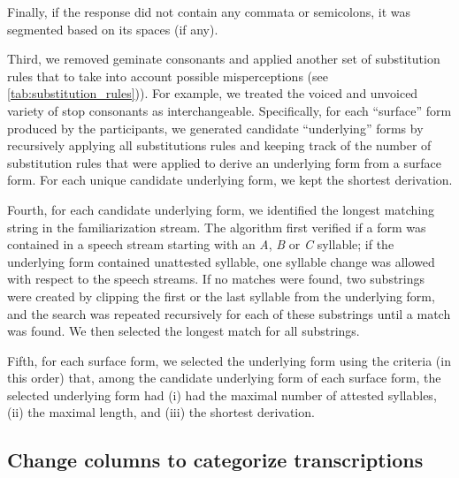 \documentclass[]{article}
\begin{document}
Finally, if the response did not contain any commata or semicolons, it
was segmented based on its spaces (if any).

Third, we removed geminate consonants and applied another set of
substitution rules that to take into account possible misperceptions
(see \ref{tab:substitution_rules})). For example, we treated the voiced
and unvoiced variety of stop consonants as interchangeable.
Specifically, for each ``surface'' form produced by the participants, we
generated candidate ``underlying'' forms by recursively applying all
substitutions rules and keeping track of the number of substitution
rules that were applied to derive an underlying form from a surface
form. For each unique candidate underlying form, we kept the shortest
derivation.

Fourth, for each candidate underlying form, we identified the longest
matching string in the familiarization stream. The algorithm first
verified if a form was contained in a speech stream starting with an
\emph{A}, \emph{B} or \emph{C} syllable; if the underlying form
contained unattested syllable, one syllable change was allowed with
respect to the speech streams. If no matches were found, two substrings
were created by clipping the first or the last syllable from the
underlying form, and the search was repeated recursively for each of
these substrings until a match was found. We then selected the longest
match for all substrings.

Fifth, for each surface form, we selected the underlying form using the
criteria (in this order) that, among the candidate underlying form of
each surface form, the selected underlying form had (i) had the maximal
number of attested syllables, (ii) the maximal length, and (iii) the
shortest derivation.

\subsection{Change columns to categorize
transcriptions}\label{change-columns-to-categorize-transcriptions}
\end{document}
